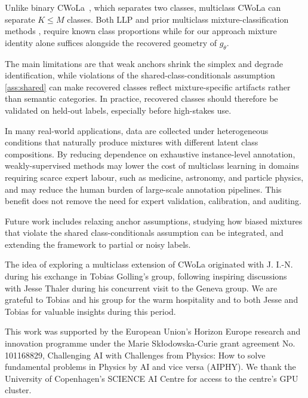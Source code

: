 \documentclass{article}
\theoremstyle{plain}
\theoremstyle{definition}
\theoremstyle{remark}
\newcommand{\asmp}[1]{\ref{#1}} %
\begin{document}
Unlike binary CWoLa~\citep{Metodiev:2017vrx}, which separates two classes, multiclass CWoLa can separate $K\leq M$ classes. Both LLP and prior multiclass mixture-classification methods \citep{Tang2022MulticlassCF,wei2024consistent}, require known class proportions while for our approach mixture identity alone suffices alongside the recovered geometry of $g_\theta$. 

The main limitations are that weak anchors shrink the simplex and degrade identification, while violations of the shared-class-conditionals assumption \asmp{ass:shared} can make recovered classes reflect mixture-specific artifacts rather than semantic categories. In practice, recovered classes should
therefore be validated on held-out labels, especially before high-stakes use.

In many real-world applications, data are collected under heterogeneous conditions that naturally produce mixtures with different latent class compositions. By reducing dependence on exhaustive instance-level annotation, weakly-supervised methods may lower the cost of multiclass learning in domains requiring scarce expert labour, such as medicine, astronomy, and particle physics, and may reduce the human burden of large-scale annotation pipelines. This benefit does not remove the need for expert validation, calibration,
and auditing.

Future work includes relaxing anchor assumptions, studying how biased mixtures that violate the shared class-conditionals assumption can be integrated, and extending the framework to partial or noisy labels.


\begin{ack}
The idea of exploring a multiclass extension of CWoLa originated with J. I.-N. during his exchange in Tobias Golling's group, following inspiring discussions with Jesse Thaler during his concurrent visit to the Geneva group. We are grateful to Tobias and his group for the warm hospitality and to both Jesse and Tobias for valuable insights during this period.

This work was supported by the European Union's Horizon Europe research
and innovation programme under the Marie Sk\l{}odowska-Curie grant
agreement No. 101168829, Challenging AI with Challenges from Physics:
How to solve fundamental problems in Physics by AI and vice versa (AIPHY).
We thank the University of Copenhagen's SCIENCE AI Centre for access to the centre’s GPU cluster.

\end{ack}
\end{document}
